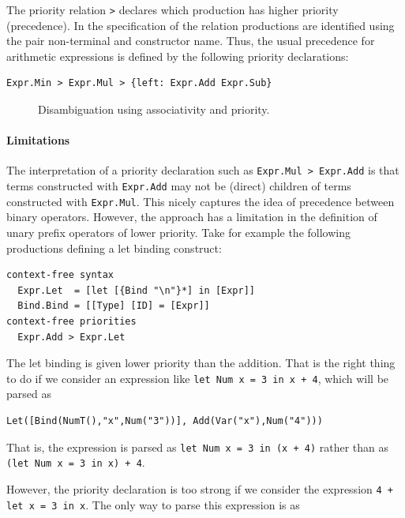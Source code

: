 The priority relation \texttt{>} declares which production has higher priority
(precedence). In the specification of the relation productions are identified
using the pair non-terminal and constructor name. Thus, the usual precedence for
arithmetic expressions is defined by the following priority declarations:

\begin{lstlisting}[language=SDF]
Expr.Min > Expr.Mul > {left: Expr.Add Expr.Sub} 
\end{lstlisting}

\begin{figure}

\caption{Disambiguation using associativity and priority.}
\end{figure}


\paragraph{Limitations}

The interpretation of a priority declaration such as \texttt{Expr.Mul >
Expr.Add} is that terms constructed with \texttt{Expr.Add} may not be (direct)
children of terms constructed with \texttt{Expr.Mul}. This nicely captures the
idea of precedence between binary operators. However, the approach has a
limitation in the definition of unary prefix operators of lower priority.
Take for example the following productions defining a let binding construct:

\begin{lstlisting}[language=SDF]
context-free syntax
  Expr.Let  = [let [{Bind "\n"}*] in [Expr]]  
  Bind.Bind = [[Type] [ID] = [Expr]]
context-free priorities
  Expr.Add > Expr.Let
\end{lstlisting}

The let binding is given lower priority than the addition. That is the right
thing to do if we consider an expression like \texttt{let Num x = 3 in x + 4},
which will be parsed as 

\begin{lstlisting}[language=aterm]
Let([Bind(NumT(),"x",Num("3"))], Add(Var("x"),Num("4")))
\end{lstlisting}

That is, the expression is parsed as \texttt{let Num x = 3 in (x + 4)} rather
than as \texttt{(let Num x = 3 in x) + 4}.

However, the priority declaration is too strong if we consider the expression
\texttt{4 + let x = 3 in x}. The only way to parse this expression is as 

